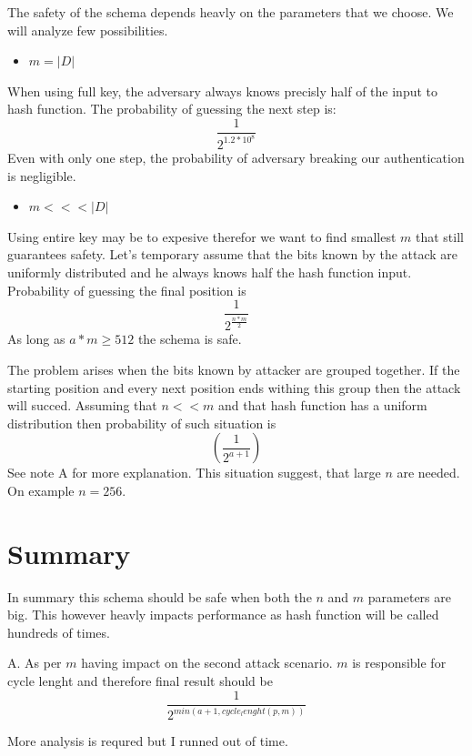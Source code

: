 \documentclass{article}
\begin{document}
The safety of the schema depends heavly on the parameters that we choose. We will analyze few
possibilities.

\begin{itemize}
    \item $m = |D|$ 
\end{itemize}

When using full key, the adversary always knows precisly half of the input to hash function.
The probability of guessing the next step is: 
\[\frac{1}{2^{1.2*10^{8}}}\]
Even with only one step, the probability of adversary breaking our authentication is negligible.

\begin{itemize}
    \item $m <<< |D|$
\end{itemize}

Using entire key may be to expesive therefor we want to find smallest $m$ that still guarantees safety.
Let's temporary assume that the bits known by the attack are uniformly distributed and he always knows
half the hash function input. Probability of guessing the final position is
\[\frac{1}{2^{\frac{n*m}{2}}}\]
As long as $a*m \geq 512$ the schema is safe.

The problem arises when the bits known by attacker are grouped together. If the starting position and
every next position ends withing this group then the attack will succed. Assuming that $n << m$ and 
that hash function has a uniform distribution then probability of such situation is 
\[(\frac{1}{2^{a+1}})\]
See note A for more explanation.
This situation suggest, that large $n$ are needed. On example $n = 256$.

\section{Summary}
In summary this schema should be safe when both the $n$ and $m$ parameters are big. 
This however heavly impacts performance as hash function will be called hundreds of times.

A. As per $m$ having impact on the second attack scenario. $m$ is responsible for cycle lenght and
therefore final result should be 
\[\frac{1}{2^{min(a+1, cycle_lenght(p,m))}}\]

More analysis is requred but I runned out of time.
\end{document}
